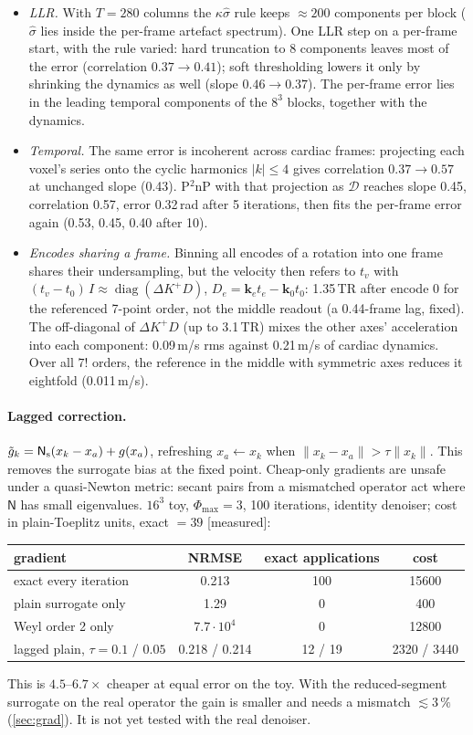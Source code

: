 \documentclass[11pt]{article}
\theoremstyle{remark}
\newcommand{\Nop}{\mathsf N}
\begin{document}
\begin{itemize}
  \item \emph{LLR.} With $T=280$ columns the $\kappa\hat\sigma$ rule keeps $\approx200$ components per block ($\hat\sigma$ lies inside the per-frame artefact spectrum). One LLR step on a per-frame start, with the rule varied: hard truncation to 8 components leaves most of the error (correlation $0.37\to0.41$); soft thresholding lowers it only by shrinking the dynamics as well (slope $0.46\to0.37$). The per-frame error lies in the leading temporal components of the $8^3$ blocks, together with the dynamics.
  \item \emph{Temporal.} The same error is incoherent across cardiac frames: projecting each voxel's series onto the cyclic harmonics $|k|\le4$ gives correlation $0.37\to0.57$ at unchanged slope (0.43). P$^2$nP with that projection as $\mathcal D$ reaches slope 0.45, correlation 0.57, error 0.32\,rad after 5 iterations, then fits the per-frame error again (0.53, 0.45, 0.40 after 10).
  \item \emph{Encodes sharing a frame.} Binning all encodes of a rotation into one frame shares their undersampling, but the velocity then refers to $t_v$ with $(t_v-t_0)\,I\approx\operatorname{diag}(\Delta K^+D)$, $D_e=\bm k_et_e-\bm k_0t_0$: 1.35\,TR after encode 0 for the referenced 7-point order, not the middle readout (a 0.44-frame lag, fixed). The off-diagonal of $\Delta K^+D$ (up to 3.1\,TR) mixes the other axes' acceleration into each component: 0.09\,m/s rms against 0.21\,m/s of cardiac dynamics. Over all $7!$ orders, the reference in the middle with symmetric axes reduces it eightfold (0.011\,m/s).
\end{itemize}

\paragraph{Lagged correction.} $\tilde g_k=\Nop_{\rm s}(x_k-x_a)+g(x_a)$, refreshing $x_a\leftarrow x_k$ when $\|x_k-x_a\|>\tau\|x_k\|$. This removes the surrogate bias at the fixed point. Cheap-only gradients are unsafe under a quasi-Newton metric: secant pairs from a mismatched operator act where $\Nop$ has small eigenvalues.
$16^3$ toy, $\Phi_{\max}=3$, 100 iterations, identity denoiser; cost in plain-Toeplitz units, exact $=39$ [measured]:
\begin{center}
\begin{tabular}{lccc}
\toprule
gradient & NRMSE & exact applications & cost\\
\midrule
exact every iteration & 0.213 & 100 & 15600\\
plain surrogate only & 1.29 & 0 & 400\\
Weyl order 2 only & $7.7\cdot10^4$ & 0 & 12800\\
lagged plain, $\tau=0.1$ / $0.05$ & 0.218 / 0.214 & 12 / 19 & 2320 / 3440\\
\bottomrule
\end{tabular}
\end{center}
This is $4.5$--$6.7\times$ cheaper at equal error on the toy. With the reduced-segment surrogate on the real operator the gain is smaller and needs a mismatch $\lesssim3\,\%$ (\cref{sec:grad}). It is not yet tested with the real denoiser.
\end{document}
